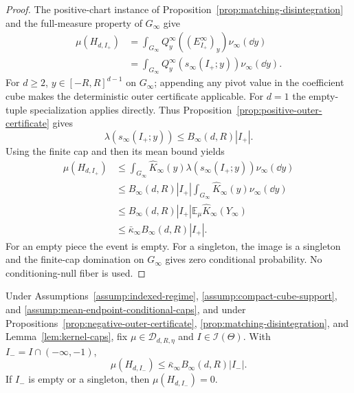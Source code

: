 \begin{proof}
The positive-chart instance of Proposition~\ref{prop:matching-disintegration}
and the full-measure property of $G_\infty$ give
\[
\begin{aligned}
\mu(H_{d,I_+})
&=\int_{G_\infty}Q^\infty_y((E^\infty_{I_+})_y)\nu_\infty(\dd y)\\
&=\int_{G_\infty}Q^\infty_y(s_\infty(I_+;y))\nu_\infty(\dd y).
\end{aligned}
\]
For $d\geq2$, $y\in[-R,R]^{d-1}$ on $G_\infty$; appending any pivot value
in the coefficient cube makes the deterministic outer certificate applicable.
For $d=1$ the empty-tuple specialization applies directly.  Thus
Proposition~\ref{prop:positive-outer-certificate} gives
\[
\lambda(s_\infty(I_+;y))\leq B_\infty(d,R)|I_+|.
\]
Using the finite cap and then its mean bound yields
\[
\begin{aligned}
\mu(H_{d,I_+})
&\leq\int_{G_\infty}\widehat K_\infty(y)
       \lambda(s_\infty(I_+;y))\nu_\infty(\dd y)\\
&\leq B_\infty(d,R)|I_+|
       \int_{G_\infty}\widehat K_\infty(y)\nu_\infty(\dd y)\\
&\leq B_\infty(d,R)|I_+|
       \mathbb E_\mu\widehat K_\infty(Y_\infty)\\
&\leq\bar\kappa_\infty B_\infty(d,R)|I_+|.
\end{aligned}
\]
For an empty piece the event is empty.  For a singleton, the image is a
singleton and the finite-cap domination on $G_\infty$ gives zero conditional
probability.  No conditioning-null fiber is used.
\end{proof}

\begin{proposition}
\label{prop:negative-chart-probability}
Under Assumptions~\ref{assump:indexed-regime},
\ref{assump:compact-cube-support}, and
\ref{assump:mean-endpoint-conditional-caps}, and under
Propositions~\ref{prop:negative-outer-certificate},
\ref{prop:matching-disintegration}, and Lemma~\ref{lem:kernel-caps}, fix
$\mu\in\mathcal D_{d,R,\eta}$ and $I\in\mathcal I(\Theta)$.  With
$I_-=I\cap(-\infty,-1)$,
\[
\mu(H_{d,I_-})\leq\bar\kappa_\infty B_\infty(d,R)|I_-|.
\]
If $I_-$ is empty or a singleton, then $\mu(H_{d,I_-})=0$.
\end{proposition}

